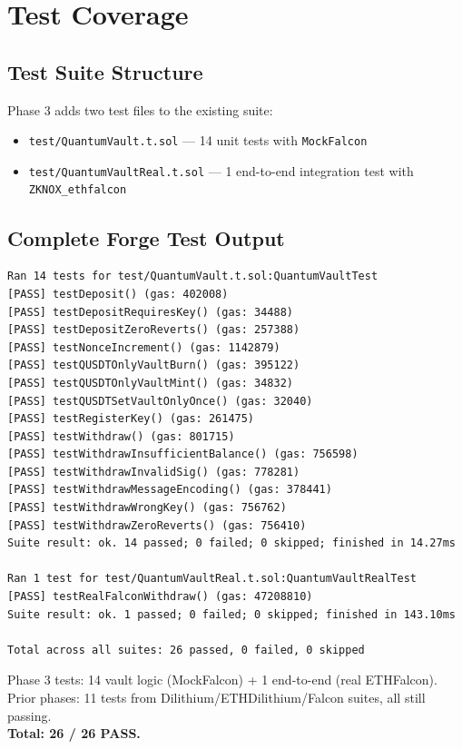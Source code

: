\documentclass[11pt,a4paper]{article}
\begin{document}
\newpage
\section{Test Coverage}

\subsection{Test Suite Structure}

Phase 3 adds two test files to the existing suite:
\begin{itemize}
  \item \texttt{test/QuantumVault.t.sol} --- 14 unit tests with \texttt{MockFalcon}
  \item \texttt{test/QuantumVaultReal.t.sol} --- 1 end-to-end integration test with \texttt{ZKNOX\_ethfalcon}
\end{itemize}

\subsection{Complete Forge Test Output}

\begin{lstlisting}[style=bash, caption={forge test --match-path "test/QuantumVault*" -vv}]
Ran 14 tests for test/QuantumVault.t.sol:QuantumVaultTest
[PASS] testDeposit() (gas: 402008)
[PASS] testDepositRequiresKey() (gas: 34488)
[PASS] testDepositZeroReverts() (gas: 257388)
[PASS] testNonceIncrement() (gas: 1142879)
[PASS] testQUSDTOnlyVaultBurn() (gas: 395122)
[PASS] testQUSDTOnlyVaultMint() (gas: 34832)
[PASS] testQUSDTSetVaultOnlyOnce() (gas: 32040)
[PASS] testRegisterKey() (gas: 261475)
[PASS] testWithdraw() (gas: 801715)
[PASS] testWithdrawInsufficientBalance() (gas: 756598)
[PASS] testWithdrawInvalidSig() (gas: 778281)
[PASS] testWithdrawMessageEncoding() (gas: 378441)
[PASS] testWithdrawWrongKey() (gas: 756762)
[PASS] testWithdrawZeroReverts() (gas: 756410)
Suite result: ok. 14 passed; 0 failed; 0 skipped; finished in 14.27ms

Ran 1 test for test/QuantumVaultReal.t.sol:QuantumVaultRealTest
[PASS] testRealFalconWithdraw() (gas: 47208810)
Suite result: ok. 1 passed; 0 failed; 0 skipped; finished in 143.10ms

Total across all suites: 26 passed, 0 failed, 0 skipped
\end{lstlisting}

\begin{resultbox}
Phase 3 tests: 14 vault logic (MockFalcon) + 1 end-to-end (real ETHFalcon). \\
Prior phases: 11 tests from Dilithium/ETHDilithium/Falcon suites, all still passing. \\
\textbf{Total: 26 / 26 PASS.}
\end{resultbox}
\end{document}
